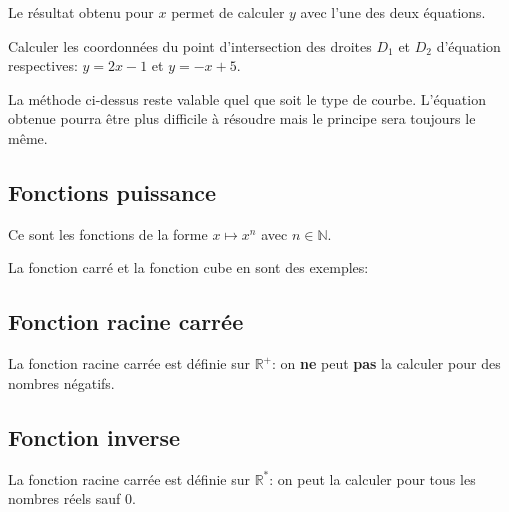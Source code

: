 \documentclass[a4paper,12pt]{scrartcl}
\begin{document}
Le résultat obtenu pour $x$ permet de calculer $y$ avec l'une des deux équations.



\exemple{}
Calculer les coordonnées du point d'intersection des droites $D_1$ et $D_2$ d'équation respectives: $y = 2x -1$ et $y = -x + 5$. 


La méthode ci-dessus reste valable quel que soit le type de courbe. L'équation obtenue pourra être plus difficile à résoudre mais le principe sera toujours le même. 



\subsection{Fonctions puissance}

Ce sont les fonctions de la forme $x \longmapsto x^n$ avec $n \in \mathbb{N}$. 

La fonction carré et la fonction cube en sont des exemples:

\begin{center}
\begin{multicols}{2}
\end{multicols}
\end{center}

\subsection{Fonction racine carrée}

La fonction racine carrée est définie sur $\mathbb{R}^+$: on \textbf{ne} peut \textbf{pas} la calculer pour des nombres négatifs.

\begin{center}
\end{center}

\subsection{Fonction inverse}

La fonction racine carrée est définie sur $\mathbb{R}^*$: on peut la calculer pour tous les nombres réels sauf 0.

\begin{center}
\end{center}
\end{document}
